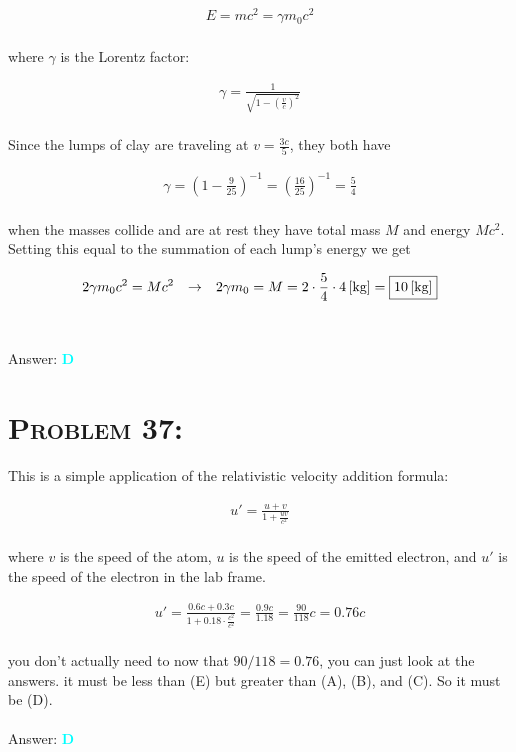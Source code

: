 \documentclass{article}
\begin{document}
\begin{gather}
E = mc^{2} =  \gamma m_{0}c^{2}
\end{gather}
\\
where $\gamma$ is the Lorentz factor:

\begin{gather}
\gamma = \frac{1}{\sqrt{1- \left(   \frac{v}{c}    \right)^{2}}}
\end{gather}
\\
Since the lumps of clay are traveling at $v = \frac{3c}{5}$, they both have

\begin{gather}
\gamma = \left(  1- \frac{9}{25} \right)^{-1} = \left( \frac{16}{25} \right)^{-1} = \frac{5}{4}\nonumber
\end{gather}
\\
when the masses collide and are at rest they have total mass $M$ and energy $Mc^{2}$. Setting this equal to the summation of each lump's energy we get

\begin{gather}
2 \gamma m_{0}c^{2} = Mc^{2} \hspace{.1in} \rightarrow \hspace{.1in} 2 \gamma m_{0} = M = 2 \cdot  \frac{5}{4} \cdot \unit[4]{[kg]} = \boxed{\unit[10]{[kg]}}\nonumber
\end{gather}
\\\\
Answer: \textbf{\textcolor{cyan}D}\\


\section{\textsc{Problem 37:}} This is a simple application of the relativistic velocity addition formula:

\begin{gather}
u' = \frac{u+v}{1+\frac{uv}{c^{2}}}
\end{gather}
\\
where $v$ is the speed of the atom, $u$ is the speed of the emitted electron, and $u'$ is the speed of the electron in the lab frame. 

\begin{gather}
u' = \frac{0.6c+0.3c}{1+0.18 \cdot \frac{c^{2}}{c^{2}}} = \frac{0.9c}{1.18} = \frac{90}{118} c = \boxed{0.76c}\nonumber
\end{gather}
\\
you don't actually need to now that $90/118 = 0.76$, you can just look at the answers. it must be less than (E) but greater than (A), (B), and (C). So it must be (D).
\\\\
Answer: \textbf{\textcolor{cyan}D}\\
\end{document}
